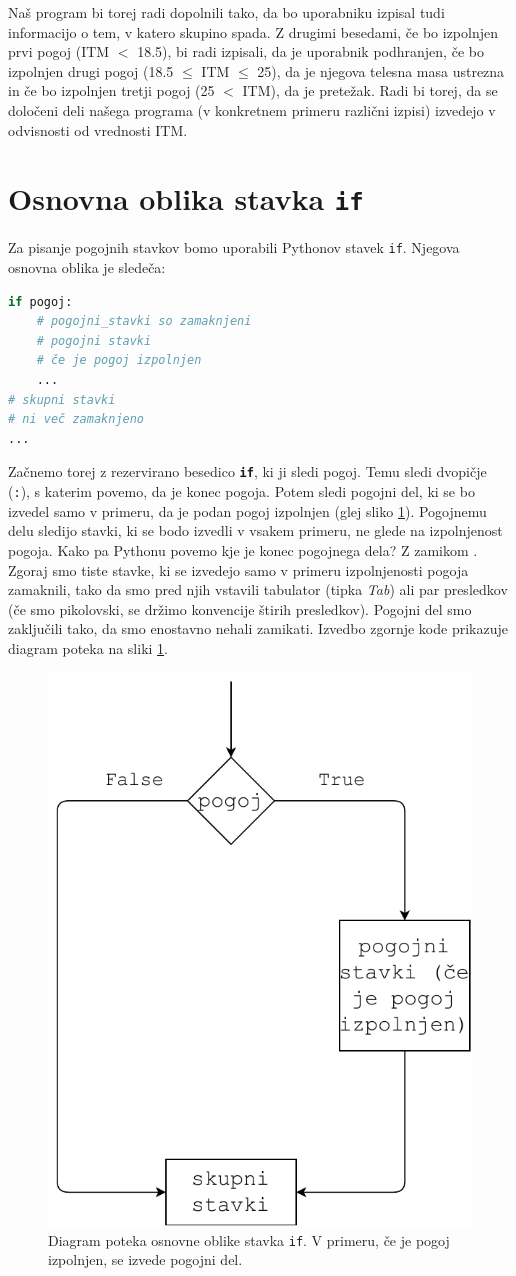 Naš program bi torej radi dopolnili tako, da bo uporabniku izpisal tudi informacijo o tem, v katero skupino spada. Z drugimi besedami, če bo izpolnjen prvi pogoj (ITM $<$ 18.5), bi radi izpisali, da je uporabnik podhranjen, če bo izpolnjen drugi pogoj (18.5 $\leq$ ITM $\leq$ 25), da je njegova telesna masa ustrezna in če bo izpolnjen tretji pogoj (25 $<$ ITM), da je pretežak. Radi bi torej, da se določeni deli našega programa (v konkretnem primeru različni izpisi) izvedejo v odvisnosti od vrednosti ITM. 

\section{Osnovna oblika stavka \texttt{if}}

Za pisanje pogojnih stavkov bomo uporabili Pythonov stavek \texttt{if}. Njegova osnovna oblika je sledeča:
\begin{lstlisting}[language=Python, showstringspaces=false]
if pogoj:
    # pogojni_stavki so zamaknjeni
    # pogojni stavki
    # če je pogoj izpolnjen
    ...
# skupni stavki
# ni več zamaknjeno
...
\end{lstlisting}
Začnemo torej z rezervirano besedico \textbf{\texttt{if}}, ki ji sledi pogoj. Temu sledi dvopičje (\texttt{:}), s katerim povemo, da je konec pogoja. Potem sledi pogojni del, ki se bo izvedel samo v primeru, da je podan pogoj izpolnjen (glej sliko \ref{img:if1}). Pogojnemu delu sledijo stavki, ki se bodo izvedli v vsakem primeru, ne glede na izpolnjenost pogoja. Kako pa Pythonu povemo kje je konec pogojnega dela? Z zamikom . Zgoraj smo tiste stavke, ki se izvedejo samo v primeru izpolnjenosti pogoja zamaknili, tako da smo pred njih vstavili tabulator (tipka \emph{Tab}) ali par presledkov (če smo pikolovski, se držimo konvencije štirih presledkov). Pogojni del smo zaključili tako, da smo enostavno nehali zamikati. Izvedbo zgornje kode prikazuje diagram poteka na sliki \ref{img:if1}.
\begin{figure}
    \centering
    \includegraphics[width=0.5\linewidth]{img/if1.pdf}
    \caption{Diagram poteka osnovne oblike stavka \texttt{if}. V primeru, če je pogoj izpolnjen, se izvede pogojni del.}
    \label{img:if1}
\end{figure}


